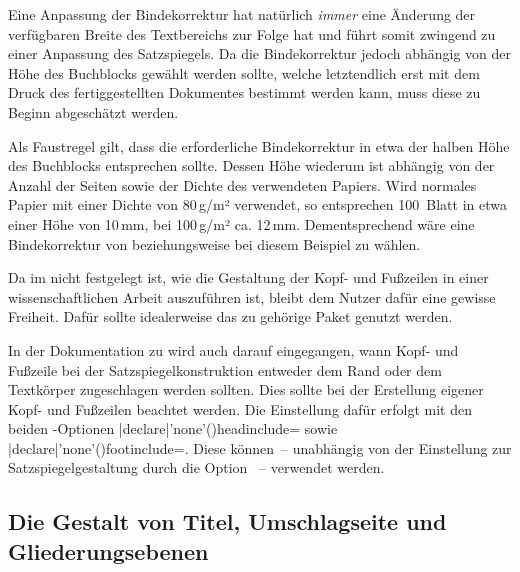 \begin{DeclareEntity*}{}
\begin{DeclareEntity*}{}
\begin{DeclareEntity*}{}
Eine Anpassung der Bindekorrektur hat natürlich \emph{immer} eine Änderung der 
verfügbaren Breite des Textbereichs zur Folge hat und führt somit zwingend zu 
einer Anpassung des Satzspiegels. Da die Bindekorrektur jedoch abhängig von der 
Höhe des Buchblocks gewählt werden sollte, welche letztendlich erst mit dem 
Druck des fertiggestellten Dokumentes bestimmt werden kann, muss diese zu 
Beginn abgeschätzt werden.
%
\begin{Example}
Als Faustregel gilt, dass die erforderliche Bindekorrektur in etwa der halben 
Höhe des Buchblocks entsprechen sollte. Dessen Höhe wiederum ist abhängig von 
der Anzahl der Seiten sowie der Dichte des verwendeten Papiers. Wird normales 
Papier mit einer Dichte von 80\,g/m² verwendet, so entsprechen 100~Blatt in 
etwa einer Höhe von 10\,mm, bei 100\,g/m² ca. 12\,mm. Dementsprechend wäre eine 
Bindekorrektur von  beziehungsweise  bei 
diesem Beispiel zu wählen.%
\end{Example}



Da im \CD nicht festgelegt ist, wie die Gestaltung der Kopf- und Fußzeilen in 
einer wissenschaftlichen Arbeit auszuführen ist, bleibt dem Nutzer dafür eine 
gewisse Freiheit. Dafür sollte idealerweise das zu \KOMAScript{} gehörige Paket 
 genutzt werden. 

In der Dokumentation zu  wird auch darauf eingegangen, wann 
Kopf- und Fußzeile bei der Satzspiegelkonstruktion entweder dem Rand oder dem 
Textkörper zugeschlagen werden sollten. Dies sollte bei der Erstellung eigener 
Kopf- und Fußzeilen beachtet werden. Die Einstellung dafür erfolgt mit den 
beiden \KOMAScript-Optionen 
\Option|declare|'none'(){headinclude=\PBoolean} sowie 
\Option|declare|'none'(){footinclude=\PBoolean}.
Diese können~-- unabhängig von der Einstellung zur Satzspiegelgestaltung durch 
die Option ~-- verwendet werden.%
%



\subsection{%
  Die Gestalt von Titel, Umschlagseite und Gliederungsebenen%
}


\end{DeclareEntity*}
\end{DeclareEntity*}
\end{DeclareEntity*}
